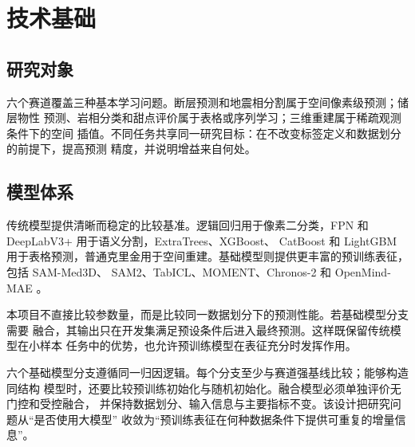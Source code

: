 \chapter{技术基础}

\section{研究对象}

六个赛道覆盖三种基本学习问题。断层预测和地震相分割属于空间像素级预测；储层物性
预测、岩相分类和甜点评价属于表格或序列学习；三维重建属于稀疏观测条件下的空间
插值。不同任务共享同一研究目标：在不改变标签定义和数据划分的前提下，提高预测
精度，并说明增益来自何处。

\section{模型体系}

传统模型提供清晰而稳定的比较基准。逻辑回归用于像素二分类，FPN 和 DeepLabV3+
用于语义分割\cite{lin2017fpn,chen2018deeplabv3plus}，ExtraTrees、XGBoost、
CatBoost 和 LightGBM 用于表格预测\cite{geurts2006extratrees,chen2016xgboost,
prokhorenkova2018catboost,ke2017lightgbm}，普通克里金用于空间重建。基础模型则提供更丰富的预训练表征，包括 SAM-Med3D、
SAM2、TabICL、MOMENT、Chronos-2 和 OpenMind-MAE
\cite{wang2023sammed3d,ravi2024sam2,qu2025tabicl,goswami2024moment,
ansari2025chronos2,wald2025openmind}。

本项目不直接比较参数量，而是比较同一数据划分下的预测性能。若基础模型分支需要
融合，其输出只在开发集满足预设条件后进入最终预测。这样既保留传统模型在小样本
任务中的优势，也允许预训练模型在表征充分时发挥作用。

六个基础模型分支遵循同一归因逻辑。每个分支至少与赛道强基线比较；能够构造同结构
模型时，还要比较预训练初始化与随机初始化。融合模型必须单独评价无门控和受控融合，
并保持数据划分、输入信息与主要指标不变。该设计把研究问题从“是否使用大模型”
收敛为“预训练表征在何种数据条件下提供可重复的增量信息”。

